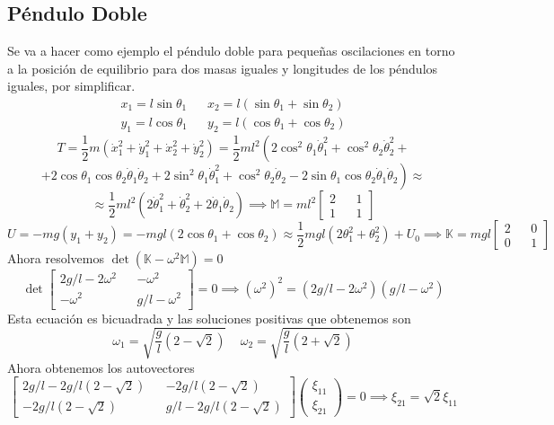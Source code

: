 \subsection{Péndulo Doble}
Se va a hacer como ejemplo el péndulo doble para pequeñas oscilaciones en torno a la posición de equilibrio para dos masas iguales y longitudes de los péndulos iguales, por simplificar.
\[
    \begin{matrix}
        x_1 = l \sin\theta_1 && x_2 = l (\sin\theta_1 + \sin\theta_2) \\
        y_1 = l \cos\theta_1 && y_2 = l (\cos\theta_1 + \cos\theta_2)
    \end{matrix}
\]
\[
    T = \frac{1}{2} m \left(\dot{x}_1^2+\dot{y}_1^2+\dot{x}_2^2+\dot{y}_2^2\right) = \frac{1}{2} m l^2 \left(2\cos^2\theta_1 \dot{\theta}_1^2 +\cos^2\theta_2 \dot{\theta}_2^2 + \right.
\]\[
    \left.+2\cos\theta_1\cos\theta_2 \dot{\theta}_1 \dot{\theta}_2 + 2\sin^2\theta_1 \dot{\theta}_1^2 +\cos^2\theta_2 \dot{\theta}_2 - 2\sin\theta_1\cos\theta_2 \dot{\theta}_1 \dot{\theta}_2\right)  \approx  
\]\[
    \approx \frac{1}{2} m l^2 \left(2 \dot{\theta}_1^2 + \dot{\theta}_2^2 + 2 \dot{\theta}_1 \dot{\theta}_2\right) \implies \mathbb{M} = ml^2 \left[\begin{matrix}
        2 && 1 \\ 1 && 1
    \end{matrix}\right]
\]
\[U = -mg (y_1+y_2) = -mgl (2 \cos\theta_1+\cos\theta_2) \approx \frac{1}{2}mgl\left(2 \theta_1^2 + \theta_2^2\right)+ U_0 \implies \mathbb{K} = mgl \left[\begin{matrix}
    2 && 0 \\ 0 && 1
\end{matrix}\right]\]
Ahora resolvemos $\det(\mathbb{K}-\omega^2 \mathbb{M}) = 0$
\[\det\left[\begin{matrix}
    2g/l-2\omega^2 && -\omega^2 \\ -\omega^2 && g/l-\omega^2
\end{matrix}\right] = 0 \implies (\omega^2)^2=(2g/l-2\omega^2)(g/l-\omega^2)\]
Esta ecuación es bicuadrada y las soluciones positivas que obtenemos son
\[\omega_1 = \sqrt{\frac{g}{l}(2-\sqrt{2})} \ \ \ \ \ \omega_2 = \sqrt{\frac{g}{l}(2+\sqrt{2})}\]
Ahora obtenemos los autovectores
\[\left[\begin{matrix}
    2g/l-2g/l(2-\sqrt{2}) && -2g/l(2-\sqrt{2}) \\ -2g/l(2-\sqrt{2}) && g/l-2g/l(2-\sqrt{2})
\end{matrix}\right] \left(\begin{matrix}
    \xi_{11} \\ \xi_{21}
\end{matrix}\right) = 0 \implies \xi_{21} = \sqrt{2}\xi_{11}\]
